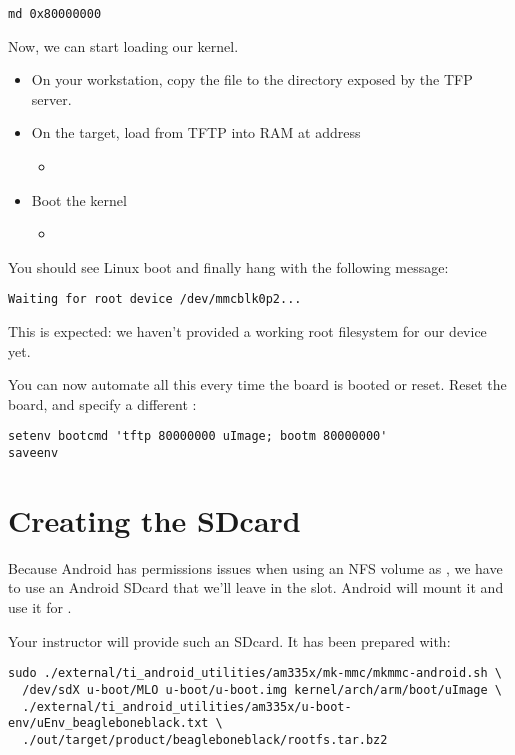 \begin{verbatim}
md 0x80000000
\end{verbatim}

Now, we can start loading our kernel.

\begin{itemize}
\item On your workstation, copy the file
   to the directory exposed by the
  TFP server.
\item On the target, load  from TFTP into RAM at address
  \begin{itemize}
  \item {}
  \end{itemize}
\item Boot the kernel
  \begin{itemize}
  \item {}
  \end{itemize}
\end{itemize}

You should see Linux boot and finally hang with the following message:

\begin{verbatim}
Waiting for root device /dev/mmcblk0p2...
\end{verbatim}

This is expected: we haven't provided a working root filesystem for
our device yet.

You can now automate all this every time the board is booted or
reset. Reset the board, and specify a different :

\begin{verbatim}
setenv bootcmd 'tftp 80000000 uImage; bootm 80000000'
saveenv
\end{verbatim}

\section{Creating the SDcard}

Because Android has permissions issues when using an NFS volume as
, we have to use an Android SDcard that we'll leave in the
slot. Android will mount it and use it for .

Your instructor will provide such an SDcard. It has been prepared
with:

\begin{verbatim}
sudo ./external/ti_android_utilities/am335x/mk-mmc/mkmmc-android.sh \
  /dev/sdX u-boot/MLO u-boot/u-boot.img kernel/arch/arm/boot/uImage \
  ./external/ti_android_utilities/am335x/u-boot-env/uEnv_beagleboneblack.txt \
  ./out/target/product/beagleboneblack/rootfs.tar.bz2
\end{verbatim}

